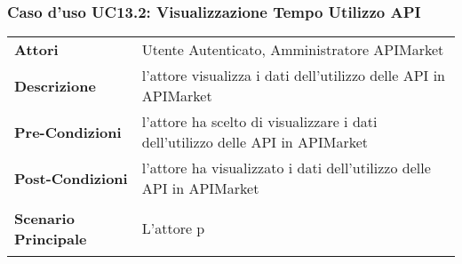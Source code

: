 \newpage
\subsubsection{Caso d'uso UC13.2: Visualizzazione Tempo Utilizzo API}
\label{UC13.2}

\renewcommand*{\arraystretch}{1.6}
\begin{longtable}{ l | p{11cm}}
	\hline
	\rowcolor{Gray}
	\multicolumn{2}{c}{UC13.2: Visualizzazione Tempo Utilizzo API} \\
	\hline
	\textbf{Attori} &Utente Autenticato, Amministratore APIMarket \\
	\textbf{Descrizione} & l'attore visualizza i dati dell'utilizzo delle API in APIMarket\\
	\textbf{Pre-Condizioni} & l'attore ha scelto di visualizzare i dati dell'utilizzo delle API in APIMarket\\
	\textbf{Post-Condizioni}&l'attore ha visualizzato i dati dell'utilizzo delle API in APIMarket\\
	\textbf{Scenario Principale} & \begin{enumerate*}[label=(\arabic*.),itemjoin={\newline}]
		\item L'attore p
	\end{enumerate*}\\
\end{longtable}
